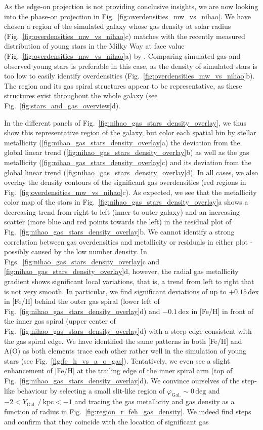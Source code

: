 \documentclass[fleqn,usenatbib]{mnras}
\begin{document}
As the edge-on projection is not providing conclusive insights, we are now looking into the phase-on projection in Fig.~\ref{fig:overdensities_mw_vs_nihao}. We have chosen a region of the simulated galaxy whose gas density at solar radius (Fig.~\ref{fig:overdensities_mw_vs_nihao}c) matches with the recently measured distribution of young stars in the Milky Way at face value (Fig.~\ref{fig:overdensities_mw_vs_nihao}a) by \citet{Poggio2021}. Comparing simulated gas and observed young stars is preferable in this case, as the density of simulated stars is too low to easily identify overdensities (Fig.~\ref{fig:overdensities_mw_vs_nihao}b). The region and its gas spiral structures appear to be representative, as these structures exist throughout the whole galaxy (see Fig.~\ref{fig:stars_and_gas_overview}d).

In the different panels of Fig.~\ref{fig:nihao_gas_stars_density_overlay}, we thus show this representative region of the galaxy, but color each spatial bin by stellar metallicity (\ref{fig:nihao_gas_stars_density_overlay}a) the deviation from the global linear trend (\ref{fig:nihao_gas_stars_density_overlay}b) as well as the gas metallicity (\ref{fig:nihao_gas_stars_density_overlay}c) and its deviation from the global linear trend (\ref{fig:nihao_gas_stars_density_overlay}d). In all cases, we also overlay the density contours of the significant gas overdensities (red regions in Fig.~\ref{fig:overdensities_mw_vs_nihao}c). As expected, we see that the metallicity color map of the stars in Fig.~\ref{fig:nihao_gas_stars_density_overlay}a shows a decreasing trend from right to left (inner to outer galaxy) and an increasing scatter (more blue and red points towards the left) in the residual plot of Fig.~\ref{fig:nihao_gas_stars_density_overlay}b. We cannot identify a strong correlation between gas overdensities and metallicity or residuals in either plot - possibly caused by the low number density. In Figs.~\ref{fig:nihao_gas_stars_density_overlay}c and \ref{fig:nihao_gas_stars_density_overlay}d, however, the radial gas metallicity gradient shows significant local variations, that is, a trend from left to right that is not very smooth. In particular, we find significant deviations of up to $+0.15\,\mathrm{dex}$ in [Fe/H] behind the outer gas spiral (lower left of Fig.~\ref{fig:nihao_gas_stars_density_overlay}d) and $-0.1\,\mathrm{dex}$ in [Fe/H] in front of the inner gas spiral (upper center of Fig.~\ref{fig:nihao_gas_stars_density_overlay}d) with a steep edge consistent with the gas spiral edge. We have identified the same patterns in both [Fe/H] and A(O) as both elements trace each other rather well in the simulation of young stars (see Fig.~\ref{fig:fe_h_vs_a_o_gas}). Tentatively, we even see a slight enhancement of [Fe/H] at the trailing edge of the inner spiral arm (top of Fig.~\ref{fig:nihao_gas_stars_density_overlay}d). We convince ourselves of the step-like behaviour by selecting a small slit-like region of $\varphi_\mathrm{Gal.} \sim 0\,\mathrm{deg}$ and $-2 < Y_\mathrm{Gal.}~/~\mathrm{kpc} < -1$ and tracing the gas metallicity and gas density as a function of radius in Fig.~\ref{fig:region_r_feh_gas_density}. We indeed find steps and confirm that they coincide with the location of significant gas 
\end{document}
